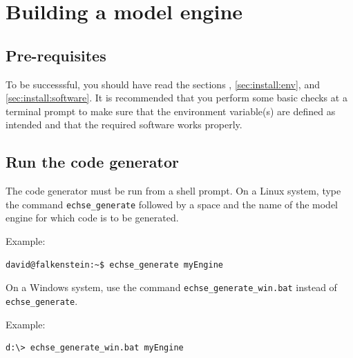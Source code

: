 
\section{Building a model engine} \label{sec:install:build}

\subsection{Pre-requisites}

To be successsful, you should have read the sections , \ref{sec:install:env}, and \ref{sec:install:software}. It is recommended that you perform some basic checks at a terminal prompt to make sure that the environment variable(s) are defined as intended and that the required software works properly.

\subsection{Run the code generator}
The code generator must be run from a shell prompt. On a Linux system, type the command \verb!echse_generate! followed by a space and the name of the model engine for which code is to be generated.

\medskip
\begin{minipage}{0.3\textwidth}
  Example:
\end{minipage}
\begin{minipage}{0.6\textwidth}
\begin{lstlisting}[style=shell]
  david@falkenstein:~$ echse_generate myEngine
\end{lstlisting}
\end{minipage}

On a Windows system, use the command  \verb!echse_generate_win.bat! instead of \verb!echse_generate!.

\medskip
\begin{minipage}{0.3\textwidth}
  Example:
\end{minipage}
\begin{minipage}{0.6\textwidth}
\begin{lstlisting}[style=shell]
  d:\> echse_generate_win.bat myEngine
\end{lstlisting}
\end{minipage}

